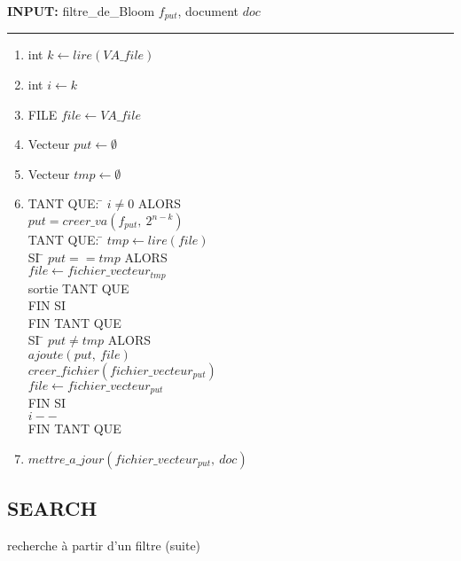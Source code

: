 \documentclass[a4paper,12pt]{report}
\begin{document}
	\begin{flushleft}
		\begin{framed}
			\textbf{INPUT:} filtre\_de\_Bloom $f_{put}$, document $doc$
		\noindent\rule{\linewidth}{0.5pt}

		\begin{enumerate}
			\item int $k \leftarrow lire(VA\_file) $
			\item int $i \leftarrow k$
			\item FILE $file \leftarrow VA\_file$
			\item Vecteur $put \leftarrow \emptyset$
			\item Vecteur $tmp \leftarrow \emptyset$
			\item
			\begin{tabbing}
				TANT QUE: \= $i \neq 0$ ALORS\\
				\> $ put = creer\_va(f_{put},\ 2^{n -k})$\\
				\> TANT QUE: \= $tmp \leftarrow lire(file)$\\
				\> \> SI \= $put == tmp$ ALORS\\
				\> \> \> $file \leftarrow fichier\_vecteur_{tmp}$\\
				\> \> \> sortie TANT QUE\\
				\> \> FIN SI\\
				\> FIN TANT QUE\\
				\> SI \= $put \neq tmp$ ALORS\\
				\> \> $ajoute(put,\ file)$\\
				\> \> $creer\_fichier(fichier\_vecteur_{put})$\\
				\> \> $file \leftarrow fichier\_vecteur_{put}$\\
				\> FIN SI\\
				\> $i--$\\
				FIN TANT QUE
			\end{tabbing}
			\item $mettre\_a\_jour(fichier\_vecteur_{put},\ doc)$
		\end{enumerate}
		\end{framed}
	\end{flushleft}
	
\subsection{SEARCH}
	\begin{algorithme}
		recherche à partir d'un filtre (suite)
	\end{algorithme} 
	
\end{document}
